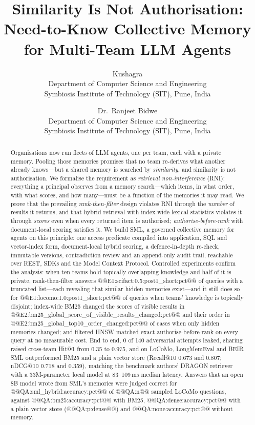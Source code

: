 \documentclass[11pt,a4paper]{article}
\title{\textbf{Similarity Is Not Authorisation:\\
Need-to-Know Collective Memory for Multi-Team LLM Agents}}
\author{
  Kushagra\\
  \small Department of Computer Science and Engineering\\
  \small Symbiosis Institute of Technology (SIT), Pune, India
  \and
  Dr.\ Ranjeet Bidwe\\
  \small Department of Computer Science and Engineering\\
  \small Symbiosis Institute of Technology (SIT), Pune, India
}
\date{}
\theoremstyle{remark}
\newcommand{\sys}{SML}
\begin{document}
\maketitle

\begin{abstract}
Organisations now run fleets of LLM agents, one per team, each with a private memory. Pooling those
memories promises that no team re-derives what another already knows---but a shared memory is searched by
\emph{similarity}, and similarity is not authorisation. We formalise the requirement as \emph{retrieval
non-interference} (RNI): everything a principal observes from a memory search---which items, in what order,
with what scores, and how many---must be a function of the memories it may read. We prove that the
prevailing \emph{rank-then-filter} design violates RNI through the \emph{number} of results it returns, and
that hybrid retrieval with index-wide lexical statistics violates it through \emph{scores} even when every
returned item is authorised; \emph{authorise-before-rank} with document-local scoring satisfies it. We build
\sys{}, a governed collective memory for agents on this principle: one access predicate compiled into
application, SQL and vector-index form, document-local hybrid scoring, a defence-in-depth re-check,
immutable versions, contradiction review and an append-only audit trail, reachable over REST, SDKs and the
Model Context Protocol. Controlled experiments confirm the analysis: when ten teams hold topically overlapping
knowledge and half of it is private, rank-then-filter answers @@E1:scifact:0.5:post1_short:pct@@ of queries with a
truncated list---each revealing that similar hidden memories exist---and it still does so for
@@E1:locomo:1.0:post1_short:pct@@ of queries when teams' knowledge is topically disjoint; index-wide BM25 changed the
scores of visible results in @@E2:bm25_global_score_of_visible_results_changed:pct@@ and their order in
@@E2:bm25_global_top10_order_changed:pct@@ of cases when only hidden memories changed; and filtered HNSW matched exact
authorise-before-rank on every query at no measurable cost. End to end, 0 of 140
adversarial attempts leaked, sharing raised cross-team Hit@1 from 0.35 to 0.975, and on LoCoMo, LongMemEval and
BEIR \sys{} outperformed BM25 and a plain vector store (Recall@10 0.673 and 0.807; nDCG@10 0.718 and 0.359),
matching the benchmark authors' DRAGON retriever with a 33M-parameter local model at 83--109\,ms median latency.
Answers that an open 8B model wrote from \sys{}'s memories were judged correct for
@@QA:sml_hybrid:accuracy:pct@@ of @@QA:n@@ sampled LoCoMo questions, against @@QA:bm25:accuracy:pct@@ with BM25,
@@QA:dense:accuracy:pct@@ with a plain vector store (@@QA:p:dense@@) and @@QA:none:accuracy:pct@@ without memory.
\end{abstract}
\end{document}
